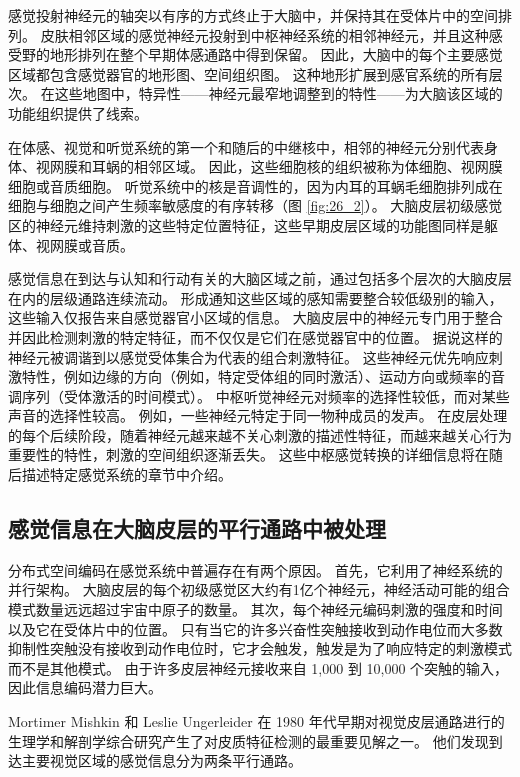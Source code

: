 感觉投射神经元的轴突以有序的方式终止于大脑中，并保持其在受体片中的空间排列。 
皮肤相邻区域的感觉神经元投射到中枢神经系统的相邻神经元，并且这种感受野的地形排列在整个早期体感通路中得到保留。 
因此，大脑中的每个主要感觉区域都包含感觉器官的地形图、空间组织图。 
这种地形扩展到感官系统的所有层次。 
在这些地图中，特异性——神经元最窄地调整到的特性——为大脑该区域的功能组织提供了线索。


在体感、视觉和听觉系统的第一个和随后的中继核中，相邻的神经元分别代表身体、视网膜和耳蜗的相邻区域。 
因此，这些细胞核的组织被称为体细胞、视网膜细胞或音质细胞。 
听觉系统中的核是音调性的，因为内耳的耳蜗毛细胞排列成在细胞与细胞之间产生频率敏感度的有序转移（图 \ref{fig:26_2}）。 
大脑皮层初级感觉区的神经元维持刺激的这些特定位置特征，这些早期皮层区域的功能图同样是躯体、视网膜或音质。


感觉信息在到达与认知和行动有关的大脑区域之前，通过包括多个层次的大脑皮层在内的层级通路连续流动。 
形成通知这些区域的感知需要整合较低级别的输入，这些输入仅报告来自感觉器官小区域的信息。 
大脑皮层中的神经元专门用于整合并因此检测刺激的特定特征，而不仅仅是它们在感觉器官中的位置。 
据说这样的神经元被调谐到以感觉受体集合为代表的组合刺激特征。 
这些神经元优先响应刺激特性，例如边缘的方向（例如，特定受体组的同时激活）、运动方向或频率的音调序列（受体激活的时间模式）。 
中枢听觉神经元对频率的选择性较低，而对某些声音的选择性较高。 
例如，一些神经元特定于同一物种成员的发声。 
在皮层处理的每个后续阶段，随着神经元越来越不关心刺激的描述性特征，而越来越关心行为重要性的特性，刺激的空间组织逐渐丢失。 
这些中枢感觉转换的详细信息将在随后描述特定感觉系统的章节中介绍。


\subsection{感觉信息在大脑皮层的平行通路中被处理}

分布式空间编码在感觉系统中普遍存在有两个原因。 
首先，它利用了神经系统的并行架构。 
大脑皮层的每个初级感觉区大约有1亿个神经元，神经活动可能的组合模式数量远远超过宇宙中原子的数量。 
其次，每个神经元编码刺激的强度和时间以及它在受体片中的位置。 
只有当它的许多兴奋性突触接收到动作电位而大多数抑制性突触没有接收到动作电位时，它才会触发，触发是为了响应特定的刺激模式而不是其他模式。 
由于许多皮层神经元接收来自 1,000 到 10,000 个突触的输入，因此信息编码潜力巨大。


Mortimer Mishkin 和 Leslie Ungerleider 在 1980 年代早期对视觉皮层通路进行的生理学和解剖学综合研究产生了对皮质特征检测的最重要见解之一。 
他们发现到达主要视觉区域的感觉信息分为两条平行通路。


